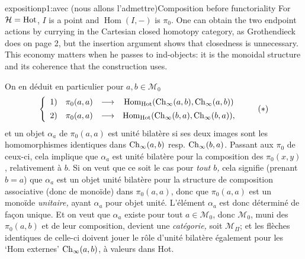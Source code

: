 \begin{dcomment}{exposition}{p1:avec (nous allons l'admettre)}{Composition before functoriality}
For $\mathcal H=\mathrm{Hot}$, $I$ is a point and $\operatorname{Hom}(I,-)$ is $\pi_0$. One can obtain the two endpoint actions by currying in the Cartesian closed homotopy category, as Grothendieck does on page 2, but the insertion argument shows that closedness is unnecessary. This economy matters when he passes to ind-objects: it is the monoidal structure and its coherence that the construction uses.
\end{dcomment}


On en déduit en particulier pour $a,b \in \mathcal{M}_0$
\[
\left\{
\begin{array}{cccc}
1) & \pi_0(a,a) & \longrightarrow & \Hom_{\Hot}(\Ch_\infty(a,b),\Ch_\infty(a,b)) \\[1ex]
2) & \pi_0(a,a) & \longrightarrow & \Hom_{\Hot}(\Ch_\infty(b,a),\Ch_\infty(b,a)),
\end{array}
\right.
\tag*{$(*)$}
\]
et un objet $\alpha_a$ de $\pi_0(a,a)$ est unité bilatère si ses deux images sont les homomorphismes identiques dans $\mathrm{Ch}_\infty(a,b)$ resp. $\mathrm{Ch}_\infty(b,a)$. Passant aux $\pi_0$ de ceux-ci, cela implique que $\alpha_a$ est unité bilatère pour la composition des $\pi_0(x,y)$, relativement à $b$. Si on veut que ce soit le cas pour \textit{tout $b$,} cela signifie (prenant $b = a$) que $\alpha_a$ est un objet unité bilatère pour la structure de composition associative (donc de monoïde) dans $\pi_0(a,a)$, donc que $\pi_0(a,a)$ est un monoïde \textit{unitaire,} ayant $\alpha_a$ pour objet unité. L'élément $\alpha_a$ est donc déterminé de façon unique. Et on veut que $\alpha_a$ existe
pour tout $a \in \mathcal{M}_0$, donc $\mathcal{M}_0$, muni des $\pi_0(a,b)$ et de leur composition, devient une \textit{catégorie,} soit $\mathcal{M}_\Pi$; et les flèches identiques de celle-ci doivent jouer le rôle d'unité bilatère également pour les `Hom externes' $\mathrm{Ch}_\infty(a,b)$, à valeurs dans Hot.

